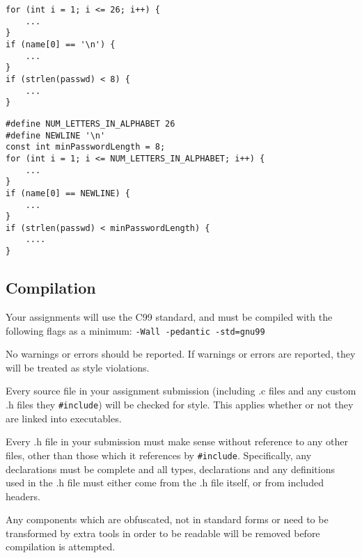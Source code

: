 \documentclass{article}
\begin{document}
\begin{minipage}{0.32\linewidth}
\begin{lstlisting}
for (int i = 1; i <= 26; i++) {
    ...
}
if (name[0] == '\n') {
    ...
}
if (strlen(passwd) < 8) {
    ...
}
\end{lstlisting}
\end{minipage}
\begin{minipage}{0.05\linewidth}
\hspace{0.2cm}
\end{minipage}
\begin{minipage}{0.55\linewidth}
%
\begin{lstlisting}
#define NUM_LETTERS_IN_ALPHABET 26
#define NEWLINE '\n'
const int minPasswordLength = 8;
for (int i = 1; i <= NUM_LETTERS_IN_ALPHABET; i++) {
    ...
}
if (name[0] == NEWLINE) {
    ...
}
if (strlen(passwd) < minPasswordLength) {
    ....
}
\end{lstlisting}
\end{minipage}


\subsection{Compilation}
Your assignments will use the C99 standard, and must be compiled with the following flags as a minimum: \texttt{-Wall -pedantic -std=gnu99}

No warnings or errors should be reported.
If warnings or errors are reported, they will be treated as style violations.

Every source file in your assignment submission (including .c files and any custom .h files they \texttt{\#include}) will be checked for style.
This applies whether or not they are linked into executables.

Every .h file in your submission must make sense without reference to any other files, other than those which it references by \texttt{\#include}.
Specifically, any declarations must be complete and all types, declarations and any definitions used in the .h file must either come from the .h file itself, or from included headers.

Any components which are obfuscated, not in standard forms or need to be transformed by extra tools in order to be readable will be removed before compilation is attempted.
\end{document}
